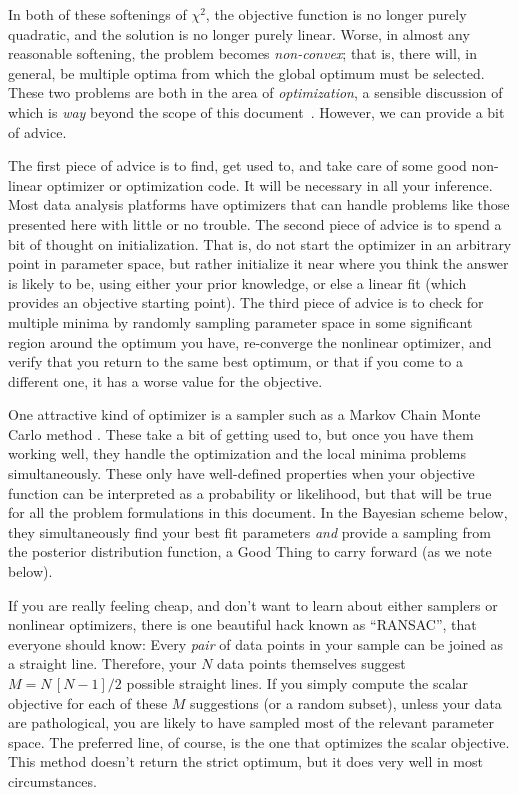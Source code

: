 \documentclass[12pt,twoside]{article}
\newcommand{\notenglish}[1]{\textsl{#1}}
\newcommand{\eg}{\notenglish{e.g.}}
\newcommand{\documentname}{document}
\newcounter{problem}
\begin{document}
In both of these softenings of $\chi^2$, the objective function is no
longer purely quadratic, and the solution is no longer purely linear.
Worse, in almost any reasonable softening, the problem becomes
\emph{non-convex}; that is, there will, in general, be multiple optima
from which the global optimum must be selected.  These two problems
are both in the area of \emph{optimization}, a sensible discussion of
which is \emph{way} beyond the scope of this \documentname\
\citep[see, \eg,][]{press}.  However, we can provide a bit of advice.

The first piece of advice is to find, get used to, and take care of
some good non-linear optimizer or optimization code.  It will be
necessary in all your inference.  Most data analysis platforms have
optimizers that can handle problems like those presented here with
little or no trouble.  The second piece of advice is to spend a bit of
thought on initialization.  That is, do not start the optimizer in an
arbitrary point in parameter space, but rather initialize it near
where you think the answer is likely to be, using either your prior
knowledge, or else a linear fit (which provides an objective starting
point).  The third piece of advice is to check for multiple minima by
randomly sampling parameter space in some significant region around
the optimum you have, re-converge the nonlinear optimizer, and verify
that you return to the same best optimum, or that if you come to a
different one, it has a worse value for the objective.

One attractive kind of optimizer is a sampler such as a Markov Chain
Monte Carlo method \citep{mackay}.  These take a bit of getting used
to, but once you have them working well, they handle the optimization
and the local minima problems simultaneously.  These only have
well-defined properties when your objective function can be
interpreted as a probability or likelihood, but that will be true for
all the problem formulations in this \documentname.  In the Bayesian
scheme below, they simultaneously find your best fit parameters
\emph{and} provide a sampling from the posterior distribution
function, a Good Thing to carry forward (as we note below).

If you are really feeling cheap, and don't want to learn about either
samplers or nonlinear optimizers, there is one beautiful hack known as
``RANSAC'', that everyone should know: Every \emph{pair} of data
points in your sample can be joined as a straight line.  Therefore,
your $N$ data points themselves suggest $M=N\,[N-1]/2$ possible
straight lines.  If you simply compute the scalar objective for each
of these $M$ suggestions (or a random subset), unless your data are
pathological, you are likely to have sampled most of the relevant
parameter space.  The preferred line, of course, is the one that
optimizes the scalar objective.  This method doesn't return the strict
optimum, but it does very well in most circumstances.
\end{document}
